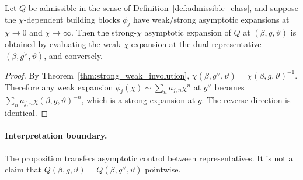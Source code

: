 \begin{proposition}
\label{prop:asymptotic_exchange}
Let \(Q\) be admissible in the sense of Definition~\ref{def:admissible_class}, and suppose the
\(\chi\)-dependent building blocks \(\phi_j\) have weak/strong asymptotic expansions at
\(\chi\to 0\) and \(\chi\to\infty\). Then the strong-\(\chi\) asymptotic expansion of \(Q\) at
\((\beta,g,\vartheta)\) is obtained by evaluating the weak-\(\chi\) expansion at the dual
representative \((\beta,g^\vee,\vartheta)\), and conversely.
\end{proposition}
\begin{proof}
By Theorem~\ref{thm:strong_weak_involution},
\(\chi(\beta,g^\vee,\vartheta)=\chi(\beta,g,\vartheta)^{-1}\). Therefore any weak expansion
\(\phi_j(\chi)\sim \sum_n a_{j,n}\chi^n\) at \(g^\vee\) becomes
\(\sum_n a_{j,n}\chi(\beta,g,\vartheta)^{-n}\), which is a strong expansion at \(g\). The reverse
direction is identical.
\end{proof}

\paragraph{Interpretation boundary.}
The proposition transfers asymptotic control between representatives. It is not a claim that
\(Q(\beta,g,\vartheta)=Q(\beta,g^\vee,\vartheta)\) pointwise.
